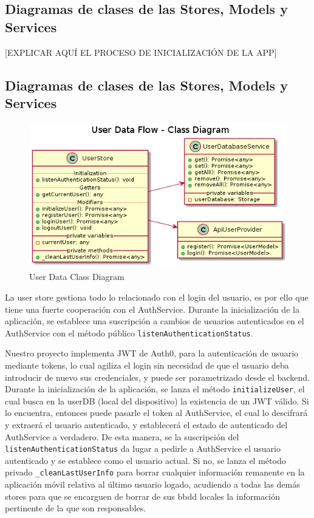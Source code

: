 \subsection{Diagramas de clases de las Stores, Models y Services}
\label{makereference4.5.4}

[EXPLICAR AQUÍ EL PROCESO DE INICIALIZACIÓN DE LA APP]

\subsection{Diagramas de clases de las Stores, Models y Services}
\label{makereference4.5.5}

\begin{figure}[hbt!]
\centering
\includegraphics[height=2.5in]{figures/diagrams/front/data-flow/user.png}
\caption[user]{User Data Class Diagram\footnotemark}
\end{figure}

La user store gestiona todo lo relacionado con el login del usuario, es por ello que tiene una fuerte cooperación con el AuthService. Durante la inicialización de la aplicación, se establece una suscripción a cambios de usuarios autenticados en el AuthService con el método público \verb|listenAuthenticationStatus|.

\vspace{0.5cm}

Nuestro proyecto implementa JWT de Auth0, para la autenticación de usuario mediante tokens, lo cual agiliza el login sin necesidad de que el usuario deba introducir de nuevo sus credenciales, y puede ser parametrizado desde el backend. Durante la inicialización de la aplicación, se lanza el método \verb|initializeUser|, el cual busca en la userDB (local del dispositivo) la existencia de un JWT válido. Si lo encuentra, entonces puede pasarle el token al AuthService, el cual lo descifrará y extraerá el usuario autenticado, y establecerá el estado de autenticado del AuthService a verdadero. De esta manera, se la suscripción del \verb|listenAuthenticationStatus| da lugar a pedirle a AuthService el usuario autenticado y se establece como el usuario actual. Si no, se lanza el método privado \verb|_cleanLastUserInfo| para borrar cualquier información remanente en la aplicación móvil relativa al último usuario logado, acudiendo a todas las demás stores para que se encarguen de borrar de sus \gls{bbdd} locales la información pertinente de la que son responsables.

